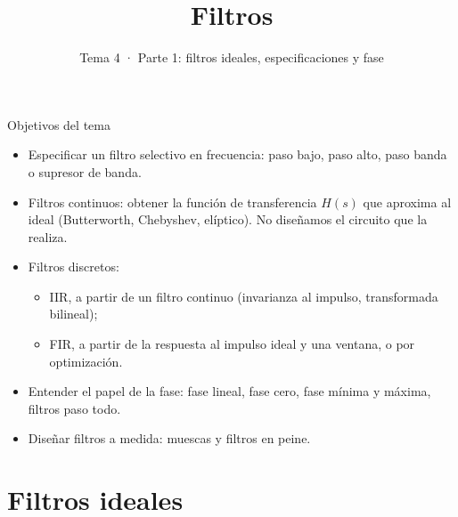 \documentclass[aspectratio=169,11pt]{beamer}
\title[T4 · Introducción]{Filtros}
\subtitle{Tema 4 · Parte 1: filtros ideales, especificaciones y fase}
\begin{document}
\portada

\begin{frame}{Objetivos del tema}
  \begin{itemize}
    \item Especificar un filtro selectivo en frecuencia: paso bajo, paso alto, paso banda o supresor de banda.
    \item \alert{Filtros continuos}: obtener la función de transferencia $H(s)$ que aproxima al ideal (Butterworth, Chebyshev, elíptico). No diseñamos el circuito que la realiza.
    \item \alert{Filtros discretos}:
    \begin{itemize}
      \item IIR, a partir de un filtro continuo (invarianza al impulso, transformada bilineal);
      \item FIR, a partir de la respuesta al impulso ideal y una ventana, o por optimización.
    \end{itemize}
    \item Entender el papel de la fase: fase lineal, fase cero, fase mínima y máxima, filtros paso todo.
    \item Diseñar filtros a medida: muescas y filtros en peine.
  \end{itemize}
  \bigskip
\end{frame}

\section{Filtros ideales}
\end{document}
